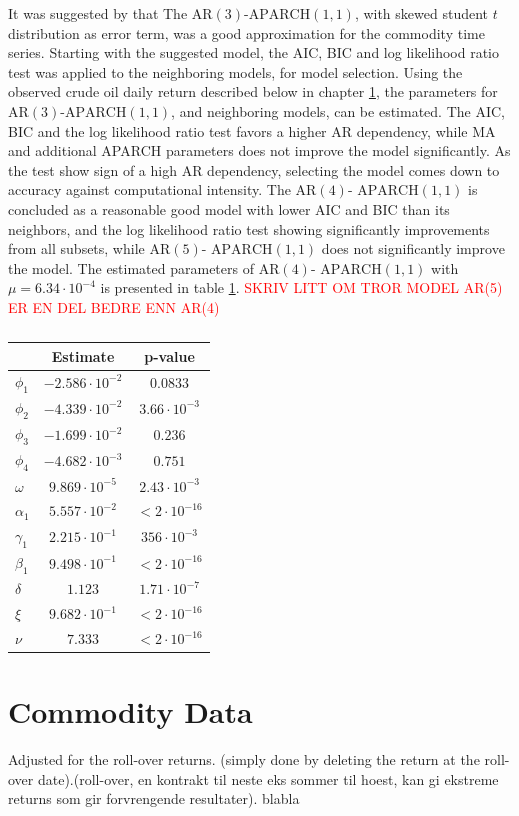 It was suggested by \cite{aparch} that The $\text{AR}(3)$-$\text{APARCH}(1,1)$, with skewed student $t$ distribution as error term, was a good approximation for the commodity time series. Starting with the suggested model, the AIC, BIC and log likelihood ratio test was applied to the neighboring models, for model selection. Using the observed crude oil daily return described below in chapter \ref{ch:comdata}, the parameters for $\text{AR}(3)$-$\text{APARCH}(1,1)$, and neighboring models, can be estimated. The AIC, BIC and the log likelihood ratio test favors a higher AR dependency, while MA and additional APARCH parameters does not improve the model significantly. As the test show sign of a high AR dependency, selecting the model comes down to accuracy against computational intensity. The $\text{AR}(4)$- $\text{APARCH}(1,1)$ is concluded as a reasonable good model with lower AIC and BIC than its neighbors, and the log likelihood ratio test showing significantly improvements from all subsets, while $\text{AR}(5)$- $\text{APARCH}(1,1)$ does not significantly improve the model. The estimated parameters of $\text{AR}(4)$- $\text{APARCH}(1,1)$ with $\mu=6.34\cdot 10^{-4}$ is presented in table \ref{table:ar4aparch11para}.
\textcolor{red}{SKRIV LITT OM TROR MODEL AR(5) ER EN DEL BEDRE ENN AR(4)}


\begin{table}[h]
\centering
\begin{tabular}{ l c c}
    & Estimate & p-value\\
  \hline
  $\phi_1$ & $-2.586\cdot 10^{-2}$ & $0.0833$ \\
  $\phi_2$ & $-4.339\cdot 10^{-2}$ & $3.66\cdot 10^{-3}$ \\
  $\phi_3$ & $-1.699\cdot 10^{-2}$ & $0.236$ \\
  $\phi_4$ & $-4.682\cdot 10^{-3}$ & $0.751$ \\
  $\omega$ & $9.869\cdot 10^{-5}$ & $2.43\cdot 10^{-3}$\\
  $\alpha_1$& $5.557\cdot 10^{-2}$ & $<2\cdot 10^{-16}$\\
  $\gamma_1$& $2.215\cdot 10^{-1}$ & $356 \cdot 10^{-3}$ \\
  $\beta_1$ & $9.498\cdot 10^{-1}$ & $<2\cdot 10^{-16}$\\
  $\delta$ & $1.123$ & $1.71 \cdot 10^{-7}$\\
  $\xi$ & $9.682 \cdot 10^{-1}$ & $<2\cdot 10^{-16}$\\
  $\nu$ & $7.333$ & $<2\cdot 10^{-16}$\\
\end{tabular}
\caption{}
\label{table:ar4aparch11para}
\end{table}



\cite{aparch} %
\section{Commodity Data}
\label{ch:comdata}
Adjusted for the roll-over returns. (simply done by deleting the return at the roll-over date).(roll-over, en kontrakt til neste eks sommer til hoest, kan gi ekstreme returns som gir  forvrengende resultater).
blabla